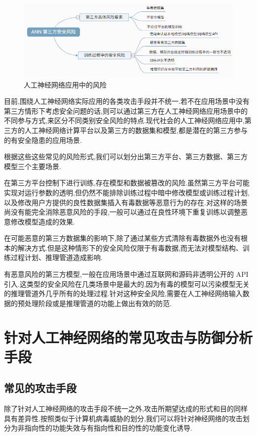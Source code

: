 \begin{figure}
	\centering
	\includegraphics[scale=0.7]{Figures/situation.png}
	\caption{人工神经网络应用中的风险}
\end{figure}

目前,围绕人工神经网络实际应用的各类攻击手段并不统一.若不在应用场景中没有第三方情形下考虑安全问题的话,则可以通过第三方在人工神经网络应用场景中的不同参与方式,来区分不同类别安全风险的特点.现代社会的人工神经网络应用中,第三方的人工神经网络计算平台以及第三方的数据集和模型,都是潜在的第三方参与的有安全隐患的应用场景.

根据这些这些常见的风险形式,我们可以划分出第三方平台、第三方数据、第三方模型三个主要场景.

在第三方平台控制下进行训练,存在模型和数据被篡改的风险.虽然第三方平台可能实现对运行参数的透明,但仍然不能排除训练过程中暗中修改模型或训练过程计划,以及修改用户方提供的良性数据集插入有毒数据等恶意行为的存在.对这样的场景尚没有能完全消除恶意风险的手段,一般可以通过在良性环境下重复训练以调整恶意修改模型造成的效果.

在可能恶意的第三方数据集的影响下,除了通过某些方式清除有毒数据外也没有根本的解决方式.但是这种情形下的安全风险仅限于有毒数据,而无法对模型结构、训练过程计划、推理管道造成影响.

有恶意风险的第三方模型,一般在应用场景中通过互联网和源码非透明公开的 API 引入.这类型的安全风险在几类场景中是最大的,因为有毒的模型可以污染模型无关的推理管道外几乎所有的处理过程.针对这种安全风险,需要在人工神经网络输入数据的预处理阶段或是推理管道的功能上做出有效的防范.

\section{针对人工神经网络的常见攻击与防御分析手段}
\subsection{常见的攻击手段}
除了针对人工神经网络的攻击手段不统一之外,攻击所期望达成的形式和目的同样具有差异性.按照类似于计算机病毒威胁的划分,我们可以将针对神经网络的攻击划分为非指向性的功能失效与有指向性和目的性的功能变化诱导.

